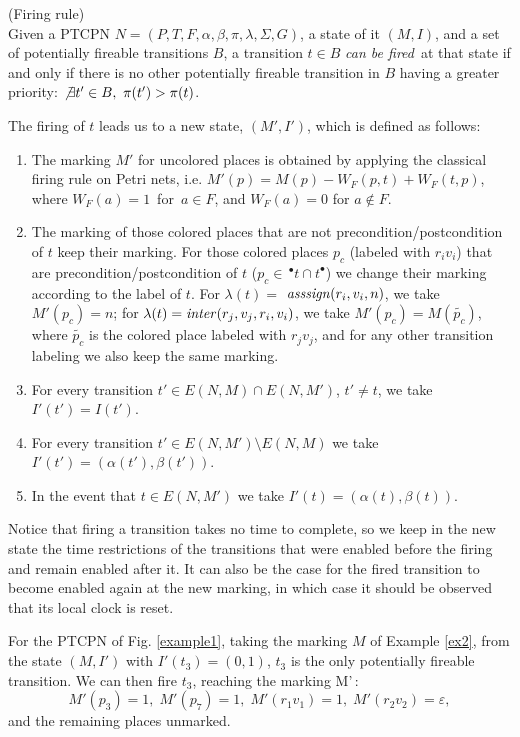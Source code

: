 \begin{definition} (Firing rule)\\
Given a PTCPN $N=(P,T,F,\alpha,\beta,\pi,\lambda,\Sigma, G)$, a
state of it $(M,I)$, and a set of potentially fireable transitions
$B$, a transition $t \in B$ {\em can be fired}\, at that state if
and only if
there is no other potentially fireable transition in $B$
having a greater priority:
$\not\exists t'\in B,\, \, \pi(t')>\pi(t)$.

The firing of $t$ leads us to a new state, $(M',I')$, which is
defined as follows:

\begin{enumerate}
\item The marking $M'$ for uncolored places is obtained by applying the classical firing
rule on Petri nets, i.e. \mbox{$M'(p) = M(p) - W_F(p,t) +
W_F(t,p)$,} where \mbox{$W_F(a)=1$ for $a\in F$,} and
\mbox{$W_F(a)=0$} for $a\not\in F$.
%
\item The marking of those colored places that are not
precondition/postcondition of $t$ keep their marking. For
those colored places $p_c$ (labeled with $r_iv_i$) that are
precondition/postcondition of $t$ ($p_c \in \,^\bullet t \cap
t^\bullet$) we change their marking according to the label of $t$.
 For \mbox{$\lambda(t)=$} \mbox{${\it
asssign}(r_i,v_i,n)$,} we take \mbox{$M'(p_c)=n$;} for
\mbox{$\lambda(t)={\it inter}(r_j,v_j,r_i,v_i)$}, we take
\mbox{$M'(p_c)=M(\widetilde{p_c})$,} where $\widetilde{p_c}$ is the
colored place labeled with $r_jv_j$, and for any other transition
labeling we also keep the same marking.
%
\item For every transition $t' \in E(N,M) \cap E(N,M')$, $t'\neq t$,
we take $I'(t') = I(t')$.
%
\item For every transition $t' \in E(N,M') \setminus E(N,M)$
we take $I'(t') = (\alpha(t'),\beta(t'))$.
%
\item In the event that $t \in E(N,M')$ we take
$I'(t) = (\alpha(t),\beta(t))$.
%
\end{enumerate}

\end{definition}

Notice that firing a transition takes no time to complete, so we
keep in the new state the time restrictions of the transitions that
were enabled before the firing and remain enabled after it. It can
also be the case for the fired transition to become enabled again at
the new marking, in which case it should be observed 
that its local clock is reset.
%

\begin{example}\label{ex5} For the PTCPN of Fig. \ref{example1}, taking the
marking $M$ of  Example \ref{ex2},  from the state $(M,I')$ with\;
\(I'(t_3)=(0,1)\),  $t_3$ is the only potentially fireable
transition.  We can then fire $t_3$, reaching the marking M'\,:
%
\[M'(p_3)=1, \; M'(p_7)=1, \; M'(r_1v_1)=1, \; M'(r_2v_2)=\varepsilon ,\]
and the remaining places unmarked.
%
\end{example}


